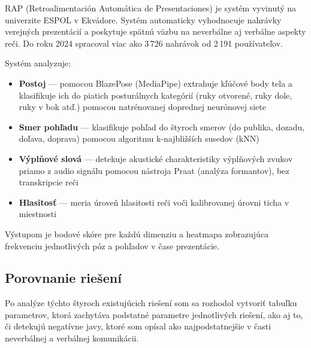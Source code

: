 RAP (Retroalimentación Automática de Presentaciones) je systém vyvinutý na univerzite ESPOL v Ekvádore\cite{rap}. Systém automaticky vyhodnocuje nahrávky verejných prezentácií a poskytuje spätnú väzbu na neverbálne aj verbálne aspekty reči. Do roku 2024 spracoval viac ako 3\,726 nahrávok od 2\,191 používateľov.

Systém analyzuje:
\begin{itemize}
    \item \textbf{Postoj} --- pomocou BlazePose (MediaPipe) extrahuje kľúčové body tela a klasifikuje ich do piatich posturálnych kategórií (ruky otvorené, ruky dole, ruky v bok atď.) pomocou natrénovanej doprednej neurónovej siete
    \item \textbf{Smer pohľadu} --- klasifikuje pohľad do štyroch smerov (do publika, dozadu, doľava, doprava) pomocou algoritmu k-najbližších susedov (kNN)
    \item \textbf{Výplňové slová} --- detekuje akustické charakteristiky výplňových zvukov priamo z audio signálu pomocou nástroja Praat (analýza formantov), bez transkripcie reči
    \item \textbf{Hlasitosť} --- meria úroveň hlasitosti reči voči kalibrovanej úrovni ticha v miestnosti
\end{itemize}

Výstupom je bodové skóre pre každú dimenziu a heatmapa zobrazujúca frekvenciu jednotlivých póz a pohľadov v čase prezentácie.

\subsection{Porovnanie riešení}

Po analýze týchto štyroch existujúcich riešení som sa rozhodol vytvoriť tabuľku parametrov, ktorá zachytáva podstatné parametre jednotlivých riešení, ako aj to, či detekujú negatívne javy, ktoré som opísal ako najpodstatnejšie v časti neverbálnej a verbálnej komunikácii.
\newpage

